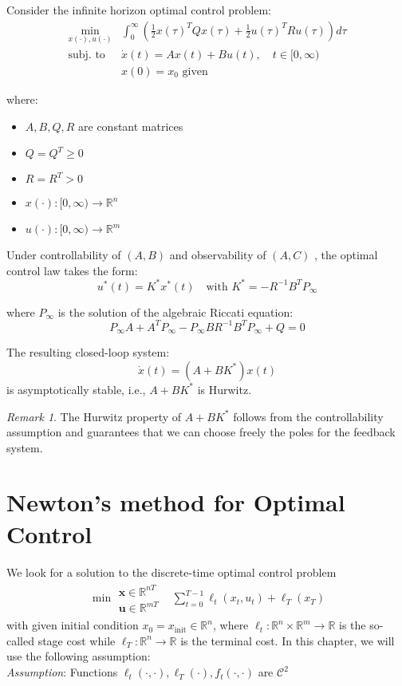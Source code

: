 \documentclass[openany]{book}
\newcommand{\R}{\mathbb{R}}               %
\theoremstyle{definition}
\theoremstyle{remark}
\newtheorem*{remark}{Remark}
\begin{document}
Consider the infinite horizon optimal control problem:
\begin{align*}
    \min_{x(\cdot),u(\cdot)} & \int_0^{\infty} \left(\frac{1}{2}x(\tau)^TQx(\tau) + \frac{1}{2}u(\tau)^TRu(\tau)\right)d\tau\\
    \text{subj. to } & \dot{x}(t) = Ax(t) + Bu(t), \quad t \in [0,\infty)\\
    & x(0) = x_0 \text{ given}
\end{align*}

where:
\begin{itemize}
    \item $A,B,Q,R$ are constant matrices
    \item $Q = Q^T \geq 0$
    \item $R = R^T > 0$
    \item $x(\cdot):[0,\infty) \to \mathbb{R}^n$
    \item $u(\cdot):[0,\infty) \to \mathbb{R}^m$
\end{itemize}

Under controllability of $(A,B)$ and observability of $(A,C)$ , the optimal control law takes the form:
\[
    u^*(t) = K^*x^*(t) \quad \text{with } K^* = -R^{-1}B^TP_\infty
\]

where $P_\infty$ is the solution of the algebraic Riccati equation:
\[
    P_\infty A + A^TP_\infty - P_\infty BR^{-1}B^TP_\infty + Q = 0
\]

The resulting closed-loop system:
\[
    \dot{x}(t) = (A + BK^*)x(t)
\]
is asymptotically stable, i.e., $A + BK^*$ is Hurwitz.

\begin{remark}
The Hurwitz property of $A + BK^*$ follows from the controllability assumption and guarantees that we can choose freely the poles for the feedback system.
\end{remark}

\chapter{Newton's method for Optimal Control}
We look for a solution to the discrete-time optimal control problem 
\begin{align*}
    \min{\substack{\mathbf{x}\in\R^{nT}\\\mathbf{u}\in\R^{mT}}} & \displaystyle\sum_{t=0}^{T-1} \ell_t(x_t,u_t)+\ell_T(x_T)
\end{align*}
with given initial condition $x_0=x_{\text{init}}\in\R^n$, where $\ell_t:\R^n\times\R^m\to\R$ is the so-called stage cost while $\ell_T:\R^n\to\R$ is the terminal cost. In this chapter, we will use the following assumption:\\
\emph{Assumption}: Functions $\ell_t(\cdot,\cdot),\ell_T(\cdot),f_t(\cdot,\cdot)$ are $\mathcal{C}^2$
\end{document}
